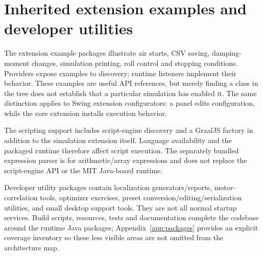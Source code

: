 
\section{Inherited extension examples and developer utilities}
The extension example packages illustrate air starts, CSV saving, damping-moment changes, simulation printing, roll control and stopping conditions. Providers expose examples to discovery; runtime listeners implement their behavior. These examples are useful API references, but merely finding a class in the tree does not establish that a particular simulation has enabled it. The same distinction applies to Swing extension configurators: a panel edits configuration, while the core extension installs execution behavior.

The scripting support includes script-engine discovery and a GraalJS factory in addition to the simulation extension itself. Language availability and the packaged runtime therefore affect script execution. The separately bundled expression parser is for arithmetic/array expressions and does not replace the script-engine API or the MIT Java-board runtime.

Developer utility packages contain localization generators/reports, motor-correlation tools, optimizer exercises, preset conversion/editing/serialization utilities, and small desktop support tools. They are not all normal startup services. Build scripts, resources, tests and documentation complete the codebase around the runtime Java packages; Appendix~\ref{app:packages} provides an explicit coverage inventory so these less visible areas are not omitted from the architecture map.
